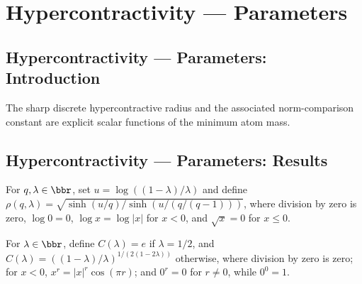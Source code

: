 \section{Hypercontractivity --- Parameters}
\subsection*{Hypercontractivity --- Parameters: Introduction}
The sharp discrete hypercontractive radius and the associated norm-comparison constant are explicit scalar functions of the minimum atom mass.

\subsection*{Hypercontractivity --- Parameters: Results}

\begin{definition}
\leanok
For $q,\lambda\in\bbr$, set $u=\log((1-\lambda)/\lambda)$ and define $\rho(q,\lambda)=\sqrt{\sinh(u/q)/\sinh(u/(q/(q-1)))}$, where division by zero is zero, $\log 0=0$, $\log x=\log|x|$ for $x<0$, and $\sqrt x=0$ for $x\le0$.
\end{definition}

\begin{definition}
\leanok
For $\lambda\in\bbr$, define $C(\lambda)=e$ if $\lambda=1/2$, and $C(\lambda)=((1-\lambda)/\lambda)^{1/(2(1-2\lambda))}$ otherwise, where division by zero is zero; for $x<0$, $x^r=|x|^r\cos(\pi r)$; and $0^r=0$ for $r\ne0$, while $0^0=1$.
\end{definition}
